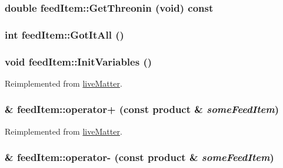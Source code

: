 \label{classfeed_item_a3f055d5bbb0f6466051560ce8806ed3f}
\hypertarget{classfeed_item_a6b9967db5cf1adde29ea5d92ff5659f2}{
\subsubsection[{GetThreonin}]{\setlength{\rightskip}{0pt plus 5cm}double feedItem::GetThreonin (void) const}}
\label{classfeed_item_a6b9967db5cf1adde29ea5d92ff5659f2}
\hypertarget{classfeed_item_ad32ea468e670ec4226661e1983116495}{
\subsubsection[{GotItAll}]{\setlength{\rightskip}{0pt plus 5cm}int feedItem::GotItAll ()}}
\label{classfeed_item_ad32ea468e670ec4226661e1983116495}
\hypertarget{classfeed_item_ae08d4c420b75b14c595dab525f96dd9d}{
\subsubsection[{InitVariables}]{\setlength{\rightskip}{0pt plus 5cm}void feedItem::InitVariables ()}}
\label{classfeed_item_ae08d4c420b75b14c595dab525f96dd9d}


Reimplemented from \hyperlink{classlive_matter_ab14efacc07e048507a6c3dd8d2942101}{liveMatter}.\hypertarget{classfeed_item_ab2bb86c4db1650dac95b927ce96f45c5}{
\subsubsection[{operator+}]{ \& feedItem::operator+ (const {\bf product} \& {\em someFeedItem})}}
\label{classfeed_item_ab2bb86c4db1650dac95b927ce96f45c5}


Reimplemented from \hyperlink{classlive_matter_ae7a333e94f166a448a4b8f8b70ebe9fe}{liveMatter}.\hypertarget{classfeed_item_aa3d93bb82d9d41b25214375a88ee36f8}{
\subsubsection[{operator-\/}]{ \& feedItem::operator-\/ (const {\bf product} \& {\em someFeedItem})}}
\label{classfeed_item_aa3d93bb82d9d41b25214375a88ee36f8}


